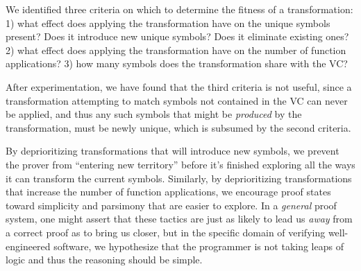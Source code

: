 We identified three criteria on which to determine the fitness of a transformation: 1) what effect does applying the transformation have on the unique symbols present?  Does it introduce new unique symbols?  Does it eliminate existing ones? 2) what effect does applying the transformation have on the number of function applications? 3) how many symbols does the transformation share with the VC?

After experimentation, we have found that the third criteria is not useful, since a transformation attempting to match symbols not contained in the VC can never be applied, and thus any such symbols that might be \emph{produced} by the transformation, must be newly unique, which is subsumed by the second criteria.

By deprioritizing transformations that will introduce new symbols, we prevent the prover from ``entering new territory'' before it's finished exploring all the ways it can transform the current symbols.  Similarly, by deprioritizing transformations that increase the number of function applications, we encourage proof states toward simplicity and parsimony that are easier to explore.  In a \emph{general} proof system, one might assert that these tactics are just as likely to lead us \emph{away} from a correct proof as to bring us closer, but in the specific domain of verifying well-engineered software, we hypothesize that the programmer is not taking leaps of logic and thus the reasoning should be simple.
